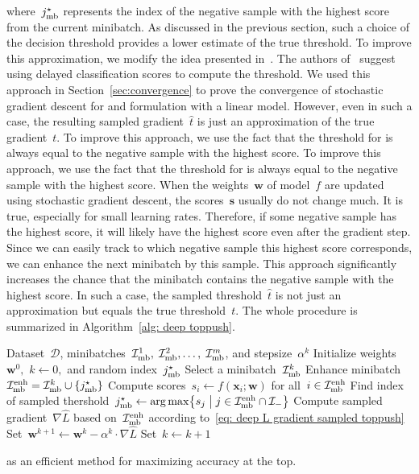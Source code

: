 where~$j^{\star}_{\text{mb}}$ represents the index of the negative sample with the highest score from the current minibatch. As discussed in the previous section, such a choice of the decision threshold provides a lower estimate of the true threshold. To improve this approximation, we modify the idea presented in~\cite{adam2019machine}. The authors of~\cite{adam2019machine} suggest using delayed classification scores to compute the threshold. We used this approach in Section~\ref{sec:convergence} to prove the convergence of stochastic gradient descent for \PatMat and \PatMatNP formulation with a linear model. However, even in such a case, the resulting sampled gradient~$\hat{t}$ is just an approximation of the true gradient~$t.$ To improve this approach, we use the fact that the threshold for \TopPush is always equal to the negative sample with  the highest score. To improve this approach, we use the fact that the threshold for \TopPush is always equal to the negative sample with the highest score. When the weights~$\bm{w}$ of model~$f$ are updated using stochastic gradient descent, the scores~$\bm{s}$ usually do not change much. It is true, especially for small learning rates. Therefore, if some negative sample has the highest score, it will likely have the highest score even after the gradient step. Since we can easily track to which negative sample this highest score corresponds, we can enhance the next minibatch by this sample. This approach significantly increases the chance that the minibatch contains the negative sample with the highest score. In such a case, the sampled threshold~$\hat{t}$ is not just an approximation but equals the true threshold~$t.$ The whole procedure is summarized in Algorithm~\ref{alg: deep toppush}.

\begin{algorithm}
  \centering
  \begin{algorithmic}[1]
    \Require Dataset~$\mathcal{D}$, minibatches~$\mathcal{I}_{\text{mb}}^1,\; \mathcal{I}_{\text{mb}}^2, \ldots, \; \mathcal{I}_{\text{mb}}^m$, and stepsize~$\alpha^k$
    \State Initialize weights~$\bm{w}^0,$ $k \gets 0,$ and random index~$j^{\star}_{\text{mb}}$
    \Repeat
    \State Select a minibatch~$\mathcal{I}_{\text{mb}}^k$
    \State Enhance minibatch~$\Imb^{\text{enh}} = \Imb^k \cup \Brac[c]{\indmaxmb}$
    \State Compute scores~$s_i \gets f(\bm{x}_i; \bm{w})$ for all~$i \in \mathcal{I}_{\text{mb}}^{\text{enh}}$
    \State Find index of sampled thershold~$\indmaxmb \gets \argmax \Set{s_j}{j \in \Imb^{\text{enh}} \cap \Ineg}$
    \State Compute sampled gradient~$\nabla \hat{L}$ based on~$\mathcal{I}_{\text{mb}}^{\text{enh}}$ according to~\eqref{eq: deep L gradient sampled toppush}
    \State Set~$\bm{w}^{k+1} \gets \bm{w}^k - \alpha^k \cdot \nabla \hat{L}$
    \State Set~$k \gets k + 1$
  \end{algorithmic}
  \caption{\DeepTopPush as an efficient method for maximizing accuracy at the top.}
  \label{alg: deep toppush}
\end{algorithm}

